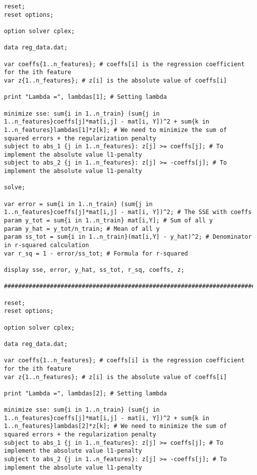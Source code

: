 \documentclass[15pt,a4paper,openright]{article}
\begin{document}
\begin{lstlisting}[language=AMPL, caption=1c Code]
reset;
reset options;

option solver cplex;

data reg_data.dat;

var coeffs{1..n_features}; # coeffs[i] is the regression coefficient for the ith feature
var z{1..n_features}; # z[i] is the absolute value of coeffs[i]

print "Lambda =", lambdas[1]; # Setting lambda

minimize sse: sum{i in 1..n_train} (sum{j in 1..n_features}coeffs[j]*mat[i,j] - mat[i, Y])^2 + sum{k in 1..n_features}lambdas[1]*z[k]; # We need to minimize the sum of squared errors + the regularization penalty
subject to abs_1 {j in 1..n_features}: z[j] >= coeffs[j]; # To implement the absolute value l1-penalty
subject to abs_2 {j in 1..n_features}: z[j] >= -coeffs[j]; # To implement the absolute value l1-penalty

solve;

var error = sum{i in 1..n_train} (sum{j in 1..n_features}coeffs[j]*mat[i,j] - mat[i, Y])^2; # The SSE with coeffs
param y_tot = sum{i in 1..n_train} mat[i,Y]; # Sum of all y
param y_hat = y_tot/n_train; # Mean of all y
param ss_tot = sum{i in 1..n_train}(mat[i,Y] - y_hat)^2; # Denominator in r-squared calculation
var r_sq = 1 - error/ss_tot; # Formula for r-squared

display sse, error, y_hat, ss_tot, r_sq, coeffs, z;

#############################################################################

reset;
reset options;

option solver cplex;

data reg_data.dat;

var coeffs{1..n_features}; # coeffs[i] is the regression coefficient for the ith feature
var z{1..n_features}; # z[i] is the absolute value of coeffs[i]

print "Lambda =", lambdas[2]; # Setting lambda

minimize sse: sum{i in 1..n_train} (sum{j in 1..n_features}coeffs[j]*mat[i,j] - mat[i, Y])^2 + sum{k in 1..n_features}lambdas[2]*z[k]; # We need to minimize the sum of squared errors + the regularization penalty
subject to abs_1 {j in 1..n_features}: z[j] >= coeffs[j]; # To implement the absolute value l1-penalty
subject to abs_2 {j in 1..n_features}: z[j] >= -coeffs[j]; # To implement the absolute value l1-penalty


\end{lstlisting}
\end{document}
